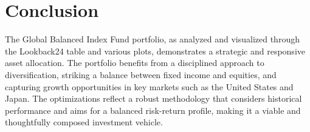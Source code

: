 \documentclass[11pt,preprint, authoryear]{elsarticle}
\numberwithin{equation}{section}
\numberwithin{figure}{section}
\numberwithin{table}{section}
\begin{document}
\hypertarget{conclusion}{%
\section{Conclusion}\label{conclusion}}

The Global Balanced Index Fund portfolio, as analyzed and visualized
through the Lookback24 table and various plots, demonstrates a strategic
and responsive asset allocation. The portfolio benefits from a
disciplined approach to diversification, striking a balance between
fixed income and equities, and capturing growth opportunities in key
markets such as the United States and Japan. The optimizations reflect a
robust methodology that considers historical performance and aims for a
balanced risk-return profile, making it a viable and thoughtfully
composed investment vehicle.


\end{document}
